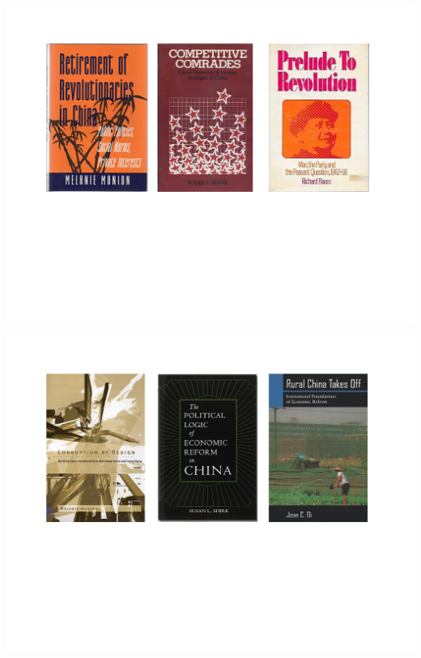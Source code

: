 \documentclass[
  10pt,
  ignorenonframetext,
]{beamer}
\begin{document}
\begin{frame}
\begin{center}\includegraphics[width=1\linewidth]{Figs/book1} \end{center}
\end{frame}

\begin{frame}
\begin{center}\includegraphics[width=1\linewidth]{Figs/book2} \end{center}
\end{frame}
\end{document}
